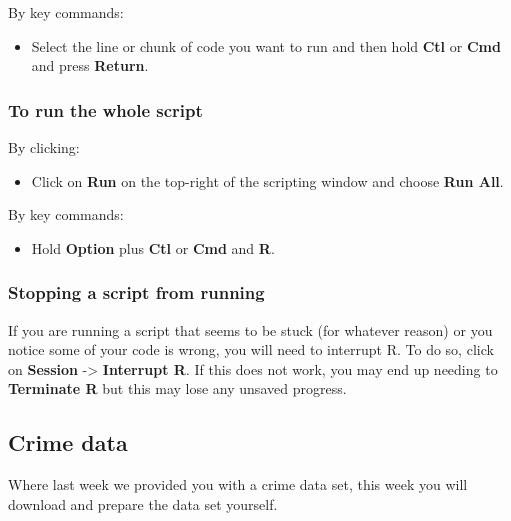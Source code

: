\documentclass[
]{book}
\providecommand{\tightlist}{%
  \setlength{\itemsep}{0pt}\setlength{\parskip}{0pt}}
\begin{document}
By key commands:

\begin{itemize}
\tightlist
\item
  Select the line or chunk of code you want to run and then hold \textbf{Ctl} or \textbf{Cmd} and press \textbf{Return}.
\end{itemize}

\hypertarget{to-run-the-whole-script}{%
\subsubsection*{To run the whole script}\label{to-run-the-whole-script}}

By clicking:

\begin{itemize}
\tightlist
\item
  Click on \textbf{Run} on the top-right of the scripting window and choose \textbf{Run All}.
\end{itemize}

By key commands:

\begin{itemize}
\tightlist
\item
  Hold \textbf{Option} plus \textbf{Ctl} or \textbf{Cmd} and \textbf{R}.
\end{itemize}

\hypertarget{stopping-a-script-from-running}{%
\subsubsection*{Stopping a script from running}\label{stopping-a-script-from-running}}

If you are running a script that seems to be stuck (for whatever reason) or you notice some of your code is wrong, you will need to interrupt R. To do so, click on \textbf{Session} -\textgreater{} \textbf{Interrupt R}. If this does not work, you may end up needing to \textbf{Terminate R} but this may lose any unsaved progress.

\hypertarget{crime-data-2}{%
\subsection{Crime data}\label{crime-data-2}}

Where last week we provided you with a crime data set, this week you will download and prepare the data set yourself.
\end{document}

